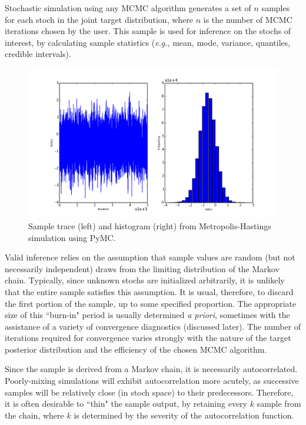 \documentclass[]{book}
\begin{document}
Stochastic simulation using any MCMC algorithm generates a set of $n$ samples for each stoch in the joint target distribution, where $n$ is the number of MCMC iterations chosen by the user. This sample is used for inference on the stochs of interest, by calculating sample statistics (\emph{e.g.}, mean, mode, variance, quantiles, credible intervals).

\begin{figure}[ht]
        \begin{center}
        \includegraphics[scale=0.4]{sample_output.png}
    \end{center}
    \caption{Sample trace (left) and histogram (right) from Metropolis-Hastings simulation using PyMC.}
    \label{fig:sample_output}
\end{figure}

Valid inference relies on the assumption that sample values are random (but not necessarily independent) draws from the limiting distribution of the Markov chain. Typically, since unknown stochs are initialized arbitrarily, it is unlikely that the entire sample satisfies this assumption. It is usual, therefore, to discard the first portion of the sample, up to some specified proportion. The appropriate size of this ``burn-in" period is usually determined  \emph{a priori}, sometimes with the assistance of a variety of convergence diagnostics (discussed later). The number of iterations required for convergence varies strongly with the nature of the target posterior distribution and the efficiency of the chosen MCMC algorithm.

Since the sample is derived from a Markov chain, it is necessarily autocorrelated. Poorly-mixing simulations will exhibit autocorrelation more acutely, as successive samples will be relatively close (in stoch space) to their predecessors. Therefore, it is often desirable to ``thin" the sample output, by retaining every $k$ sample from the chain, where $k$ is determined by the severity of the autocorrelation function.
\end{document}
